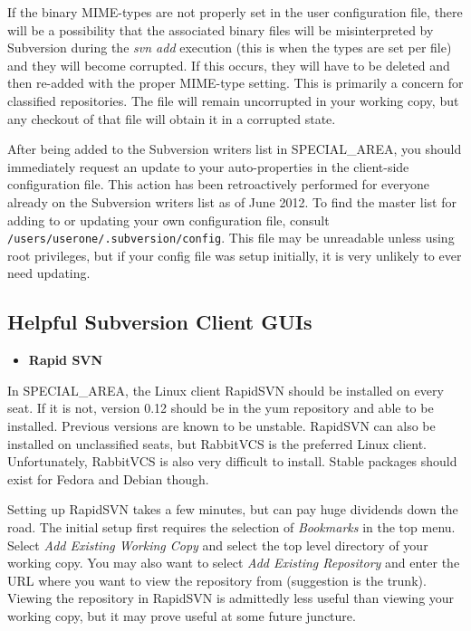 \documentclass[12pt,letterpaper]{article}
\begin{document}
If the binary MIME-types are not properly set in the user configuration file, there will be a possibility that the associated binary files will be misinterpreted by Subversion during the \emph{svn add} execution (this is when the types are set per file) and they will become corrupted.  If this occurs, they will have to be deleted and then re-added with the proper MIME-type setting.  This is primarily a concern for classified repositories.  The file will remain uncorrupted in your working copy, but any checkout of that file will obtain it in a corrupted state.

After being added to the Subversion writers list in SPECIAL_AREA, you should immediately request an update to your auto-properties in the client-side configuration file.  This action has been retroactively performed for everyone already on the Subversion writers list as of June 2012.  To find the master list for adding to or updating your own configuration file, consult \verb|/users/userone/.subversion/config|.  This file may be unreadable unless using root privileges, but if your config file was setup initially, it is very unlikely to ever need updating.

\subsection{Helpful Subversion Client GUIs}

\begin{itemize}
\item \textbf{Rapid SVN}
\end{itemize}

In SPECIAL_AREA, the Linux client RapidSVN should be installed on every seat.  If it is not, version 0.12 should be in the yum repository and able to be installed.  Previous versions are known to be unstable.  RapidSVN can also be installed on unclassified seats, but RabbitVCS is the preferred Linux client.  Unfortunately, RabbitVCS is also very difficult to install.  Stable packages should exist for Fedora and Debian though.

Setting up RapidSVN takes a few minutes, but can pay huge dividends down the road.  The initial setup first requires the selection of \emph{Bookmarks} in the top menu.  Select \emph{Add Existing Working Copy} and select the top level directory of your working copy.  You may also want to select \emph{Add Existing Repository} and enter the URL where you want to view the repository from (suggestion is the trunk).  Viewing the repository in RapidSVN is admittedly less useful than viewing your working copy, but it may prove useful at some future juncture.
\end{document}
